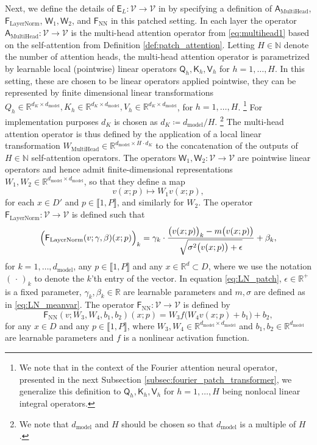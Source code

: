 \documentclass[twoside]{article}
\newcommand{\1}{\mathbbm{1}}
\newcommand{\R}{\mathbbm{R}}
\newcommand{\N}{\mathbbm{N}}
\newcommand{\cV}{\mathcal{V}}
\newcommand{\sA}{\mathsf{A}}
\newcommand{\sQ}{\mathsf{Q}}
\newcommand{\sK}{\mathsf{K}}
\newcommand{\sF}{\mathsf{F}}
\newcommand{\sE}{\mathsf{E}}
\newcommand{\sV}{\mathsf{V}}
\newcommand{\sW}{\mathsf{W}}
\newcommand{\range}[2]{\llbracket #1, #2 \rrbracket}
\providecommand{\mathbbm}{\mathbb} %
\begin{document}
Next, we define the details of $\sE_L: \cV \to \cV$ in  by specifying a definition of $\sA_\textrm{MultiHead}$, $\sF_\textrm{LayerNorm}$, $\sW_1,\sW_2$, and $\sF_{\textrm{NN}}$ in this patched setting.
In each layer the operator $\sA_{\textrm{MultiHead}}: \cV \to \cV $ is the multi-head attention operator from \eqref{eq:multihead1} based on the self-attention from Definition \ref{def:patch_attention}. Letting $H\in \N$ denote the number of attention heads, the multi-head attention operator is parametrized by learnable local (pointwise) linear operators $\sQ_h, \sK_h, \sV_h$ for $h=1,\ldots,H$. In this setting, these are chosen to be linear operators applied pointwise, they can be represented by finite dimensional linear transformations $Q_h\in \R^{d_K\times d_{\textrm{model}}},K_h\in \R^{d_K\times d_{\textrm{model}}},V_h\in \R^{d_K\times d_{\textrm{model}}}$, for $h=1,\ldots,H$. \footnote{We note that in the context of the Fourier attention neural operator, presented in the next Subsection \ref{subsec:fourier_patch_transformer}, we generalize this definition to $\sQ_h, \sK_h, \sV_h$ for $h=1,\ldots,H$ being nonlocal linear integral operators.} For implementation purposes $d_K$ is chosen as $d_K\coloneqq d_{\textrm{model}}/H$.
\footnote{We note that $d_{\textrm{model}}$ and $H$ should be chosen so that $d_{\textrm{model}}$ is a multiple of $H$.} 
The multi-head attention operator is thus defined by the application of a local linear transformation $W_{\textrm{MultiHead}}\in \R^{d_{\textrm{model}}\times H\cdot d_K}$ to the concatenation of the outputs of $H\in\N$ self-attention operators. The operators $\sW_1,\sW_2:\cV\to\cV$ are pointwise linear operators and hence admit finite-dimensional representations $W_1,W_2\in \R^{d_{\textrm{model}}\times d_{\textrm{model}}}$, so that they define a map
\begin{equation}
\label{eq:w1w2_ops}
v(x;p)\mapsto W_1v(x;p),
\end{equation}
for each $x\in D'$ and $p\in \range{1}{P}$, and similarly for $W_2$. The operator $\sF_{\textrm{LayerNorm}}: \cV \to \cV$ is defined such that
\begin{equation}
\label{eq:LN_patch}
\Bigl(\sF_{\textrm{LayerNorm}}(v;\gamma,\beta)(x;p)\Bigr)_k = \gamma_k\cdot\frac{\bigl(v(x;p)\bigr)_k - m\bigl(v(x;p)\bigr)}{\sqrt{\sigma^2\bigl(v(x;p)\bigr)+\epsilon}} +\beta_k,
\end{equation}
for $k=1,\dots,d_{\textrm{model}}$, any $p\in\range{1}{P}$ and any $x\in \R^{d}\subset D$, where we use the notation $(\,\cdot\,)_k$ to denote the $k$'th entry of the vector. In equation \eqref{eq:LN_patch}, $\epsilon\in\R^+$ is a fixed parameter, $\gamma_k,\beta_k\in\R$ are learnable parameters and $m,\sigma$ are defined as in \eqref{eq:LN_meanvar}. The operator $\sF_\textrm{NN}:\cV \to \cV$ is defined by
\begin{equation}
\label{eq:NN_patch_f}
    \sF_\textrm{NN}(v;W_3,W_4,b_1,b_2)(x;p) = W_3f\bigl(W_4v(x;p)+b_1\bigr) + b_2,
\end{equation}
for any $x\in D$ and any $p\in\range{1}{P}$, where $W_3,W_4\in\R^{d_\textrm{model}\times d_\textrm{model}}$ and $b_1,b_2 \in \R^{d_\textrm{model}}$ are learnable parameters and $f$ is a nonlinear activation function. 
\end{document}
